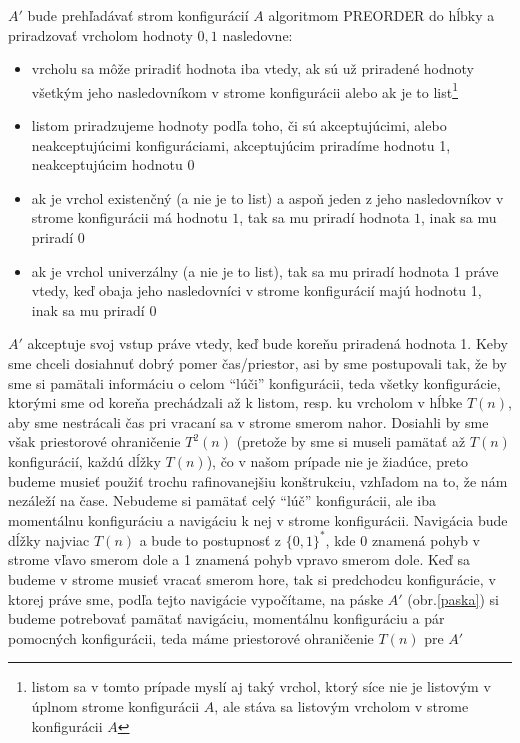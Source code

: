 \begin{dokaz}
  \smallskip
  $A'$ bude prehľadávať strom konfigurácií $A$ algoritmom PREORDER
  do hĺbky a priradzovať vrcholom hodnoty $0,1$ nasledovne:
  \begin{itemize}
    \item vrcholu sa môže priradiť hodnota iba vtedy, ak sú už
      priradené hodnoty všetkým jeho nasledovníkom v strome konfigurácii
      alebo ak je to list\footnote{listom sa v tomto prípade myslí aj
      taký vrchol, ktorý síce nie je listovým v úplnom strome
      konfigurácii $A$, ale stáva sa listovým vrcholom v strome
      konfigurácii $A$}
    \item listom priradzujeme hodnoty podľa toho, či sú akceptujúcimi,
      alebo neakceptujúcimi konfiguráciami, akceptujúcim priradíme
      hodnotu 1, neakceptujúcim hodnotu 0
    \item ak je vrchol existenčný (a nie je to list)
      a aspoň jeden z jeho nasledovníkov v strome konfigurácii má
      hodnotu $1$, tak sa mu priradí hodnota $1$, inak sa mu priradí $0$
    \item ak je vrchol univerzálny (a nie je to list), tak sa mu priradí
      hodnota 1 práve vtedy, keď obaja jeho nasledovníci v strome
      konfigurácií majú hodnotu 1, inak sa mu priradí 0
  \end{itemize}
  $A'$ akceptuje svoj vstup práve vtedy, keď bude koreňu priradená
  hodnota 1. Keby sme chceli dosiahnuť dobrý pomer čas/priestor, asi
  by sme postupovali tak, že by sme si pamätali informáciu o celom
  ``lúči'' konfigurácii, teda všetky konfigurácie, ktorými sme od
  koreňa prechádzali až k listom, resp. ku vrcholom v hĺbke $T(n)$,
  aby sme nestrácali čas pri vracaní sa v strome smerom nahor.
  Dosiahli by sme však priestorové ohraničenie $T^2(n)$ (pretože by
  sme si museli pamätať až $T(n)$ konfigurácií, každú dĺžky $T(n)$),
  čo v našom prípade nie je žiadúce, preto budeme musieť použiť
  trochu rafinovanejšiu konštrukciu, vzhľadom na to, že nám nezáleží
  na čase. Nebudeme si pamätať celý ``lúč'' konfigurácii, ale iba
  momentálnu konfiguráciu a navigáciu k nej v strome konfigurácii.
  Navigácia bude dĺžky najviac $T(n)$ a bude to postupnosť z
  $\{0,1\}^*$, kde 0 znamená pohyb v strome vľavo smerom dole a 1
  znamená pohyb vpravo smerom dole. Keď sa budeme v strome musieť
  vracať smerom hore, tak si predchodcu konfigurácie, v ktorej práve
  sme, podľa tejto navigácie vypočítame, na páske $A'$
  (obr.\ref{paska}) si budeme potrebovať pamätať navigáciu,
  momentálnu konfiguráciu a pár pomocných konfigurácii, teda máme
  priestorové ohraničenie $T(n)$ pre $A'$
\end{dokaz}


